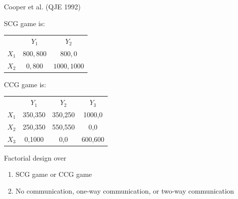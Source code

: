 \documentclass{beamer}
\begin{document}
\begin{frame}{Cooper et al. (QJE 1992)}
	\begin{card}
 SCG game is:
		\begin{center}
		\begin{tabular}{r|c|c|}
				\multicolumn{1}{r}{}& \multicolumn{1}{c}{$Y_1$}  & \multicolumn{1}{c}{$Y_2$} \\ \cline{2-3}
				$X_1$ &  $800,800$ & $800,0$ \\ \cline{2-3}
				$X_2$ &  $0,800$ & $1000,1000$ \\ \cline{2-3}
\end{tabular}
\end{center}
\end{card}
\begin{card}CCG game is:
		\begin{center}
			\begin{tabular}{r|c|c|c|}
				\multicolumn{1}{r}{ } & \multicolumn{1}{c}{$Y_1$}  & \multicolumn{1}{c}{$Y_2$} & \multicolumn{1}{c}{$Y_3$} \\ \cline{2-4}
				$X_1$ &  350,350 & 350,250  & 1000,0 \\ \cline{2-4}
				$X_2$ &  250,350 & 550,550  & 0,0 \\ \cline{2-4}
				$X_3$ &  0,1000 & 0,0  & 600,600  \\ \cline{2-4}
			\end{tabular}
		\end{center}
\end{card}
\end{frame}

\begin{frame}
	\begin{card}[Treaments]
		Factorial design over
			\begin{enumerate}
				\item SCG game or CCG game
				\item No communication, one-way communication, or two-way communication
			\end{enumerate}
	\end{card}
\end{frame}
\end{document}
